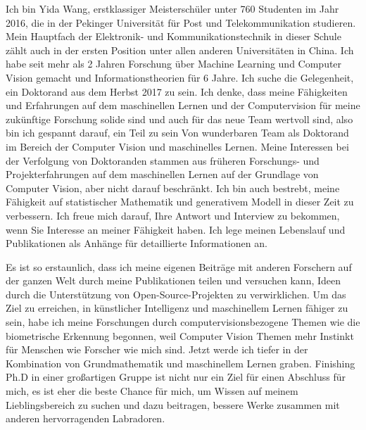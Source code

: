 \documentclass[11pt, a4paper]{awesome-cv} %
\begin{document}
\makecvheader %



Ich bin Yida Wang, erstklassiger Meisterschüler unter 760 Studenten im Jahr 2016, die in der Pekinger Universität für Post und Telekommunikation studieren. Mein Hauptfach der Elektronik- und Kommunikationstechnik in dieser Schule zählt auch in der ersten Position unter allen anderen Universitäten in China. Ich habe seit mehr als 2 Jahren Forschung über Machine Learning und Computer Vision gemacht und Informationstheorien für 6 Jahre. Ich suche die Gelegenheit, ein Doktorand aus dem Herbst 2017 zu sein. Ich denke, dass meine Fähigkeiten und Erfahrungen auf dem maschinellen Lernen und der Computervision für meine zukünftige Forschung solide sind und auch für das neue Team wertvoll sind, also bin ich gespannt darauf, ein Teil zu sein Von wunderbaren Team als Doktorand im Bereich der Computer Vision und maschinelles Lernen. Meine Interessen bei der Verfolgung von Doktoranden stammen aus früheren Forschungs- und Projekterfahrungen auf dem maschinellen Lernen auf der Grundlage von Computer Vision, aber nicht darauf beschränkt. Ich bin auch bestrebt, meine Fähigkeit auf statistischer Mathematik und generativem Modell in dieser Zeit zu verbessern. Ich freue mich darauf, Ihre Antwort und Interview zu bekommen, wenn Sie Interesse an meiner Fähigkeit haben. Ich lege meinen Lebenslauf und Publikationen als Anhänge für detaillierte Informationen an.

Es ist so erstaunlich, dass ich meine eigenen Beiträge mit anderen Forschern auf der ganzen Welt durch meine Publikationen teilen und versuchen kann, Ideen durch die Unterstützung von Open-Source-Projekten zu verwirklichen. Um das Ziel zu erreichen, in künstlicher Intelligenz und maschinellem Lernen fähiger zu sein, habe ich meine Forschungen durch computervisionsbezogene Themen wie die biometrische Erkennung begonnen, weil Computer Vision Themen mehr Instinkt für Menschen wie Forscher wie mich sind. Jetzt werde ich tiefer in der Kombination von Grundmathematik und maschinellem Lernen graben. Finishing Ph.D in einer großartigen Gruppe ist nicht nur ein Ziel für einen Abschluss für mich, es ist eher die beste Chance für mich, um Wissen auf meinem Lieblingsbereich zu suchen und dazu beitragen, bessere Werke zusammen mit anderen hervorragenden Labradoren.

\end{document}
